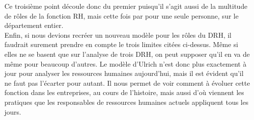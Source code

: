 Ce troisième point découle donc du premier puisqu'il s'agit aussi de la multitude de rôles de la fonction RH, mais cette fois par pour une seule personne, sur le département entier. \\



Enfin, si nous devions recréer un nouveau modèle pour les rôles du DRH, il faudrait surement prendre en compte le trois limites citées ci-dessus. Même si elles ne se basent que sur l'analyse de trois DRH, on peut supposer qu'il en va de même pour beaucoup d'autres. Le modèle d'Ulrich n'est donc plus exactement à jour pour analyser les ressources humaines aujourd'hui, mais il est évident qu'il ne faut pas l'écarter pour autant. Il nous permet de voir comment à évoluer cette fonction dans les entreprises, au cours de l'histoire, mais aussi d'où viennent les pratiques que les responsables de ressources humaines actuels appliquent tous les jours. \\